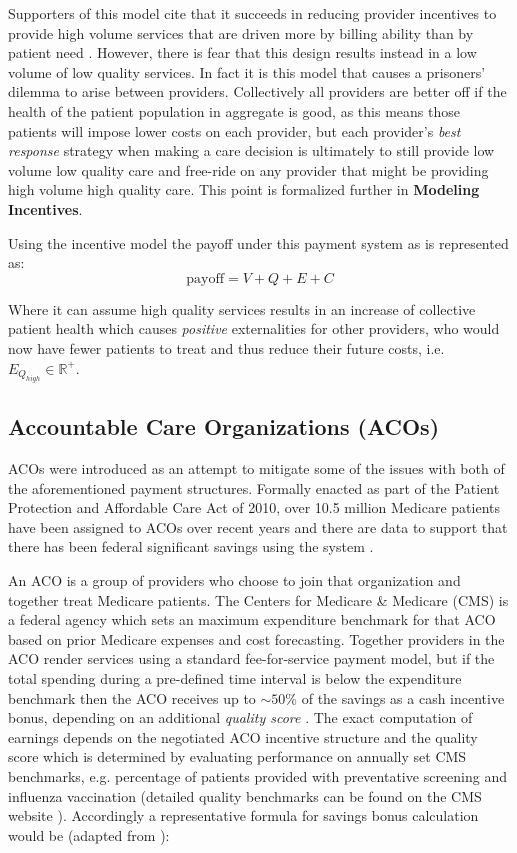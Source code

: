 \documentclass{article}
\begin{document}
Supporters of this model cite that it succeeds in reducing provider incentives to provide high volume services that are driven more by billing ability than by patient need \cite{blended}. However, there is fear that this design results instead in a low volume of low quality services. In fact it is this model that causes a prisoners' dilemma to arise between providers. Collectively all providers are better off if the health of the patient population in aggregate is good, as this means those patients will impose lower costs on each provider, but each provider's \emph{best response} strategy when making a care decision is ultimately to still provide low volume low quality care and free-ride on any provider that might be providing high volume high quality care. This point is formalized further in \textbf{Modeling Incentives}.

Using the incentive model the payoff under this payment system as is represented as:
\begin{equation}
    \text{payoff} = V + Q + E + C
\end{equation}

Where it can assume high quality services results in an increase of collective patient health which causes \emph{positive} externalities for other providers, who would now have fewer patients to treat and thus reduce their future costs, i.e. $E_{Q_{high}} \in \mathbb{R}^+$.

\subsection{Accountable Care Organizations (ACOs)} \label{sec:aco}
ACOs were introduced as an attempt to mitigate some of the issues with both of the aforementioned payment structures. Formally enacted as part of the Patient Protection and Affordable Care Act of 2010, over 10.5 million Medicare patients have been assigned to ACOs over recent years and there are data to support that there has been federal significant savings using the system \cite{acos}.

An ACO is a group of providers who choose to join that organization and together treat Medicare patients. The Centers for Medicare \& Medicare (CMS) is a federal agency which sets an maximum expenditure benchmark for that ACO based on prior Medicare expenses and cost forecasting. Together providers in the ACO render services using a standard fee-for-service payment model, but if the total spending during a pre-defined time interval is below the expenditure benchmark then the ACO receives up to ${\sim}50$\% of the savings as a cash incentive bonus, depending on an additional \emph{quality score} \cite{acos}. The exact computation of earnings depends on the negotiated ACO incentive structure and the quality score which is determined by evaluating performance on annually set CMS benchmarks, e.g. percentage of patients provided with preventative screening and influenza vaccination (detailed quality benchmarks can be found on the CMS website \cite{cms}). Accordingly a representative formula for savings bonus calculation would be (adapted from \cite{acos}):
\end{document}
